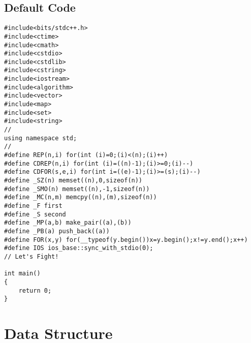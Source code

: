 \documentclass[10pt,twocolumn,oneside]{article}
\begin{document}
\subsection{Default Code}
\begin{lstlisting}
#include<bits/stdc++.h>
#include<ctime>
#include<cmath>
#include<cstdio>
#include<cstdlib>
#include<cstring>
#include<iostream>
#include<algorithm>
#include<vector>
#include<map>
#include<set>
#include<string>
//
using namespace std;
//
#define REP(n,i) for(int (i)=0;(i)<(n);(i)++)
#define CDREP(n,i) for(int (i)=((n)-1);(i)>=0;(i)--)
#define CDFOR(s,e,i) for(int i=((e)-1);(i)>=(s);(i)--)
#define _SZ(n) memset((n),0,sizeof(n))
#define _SMO(n) memset((n),-1,sizeof(n))
#define _MC(n,m) memcpy((n),(m),sizeof(n))
#define _F first
#define _S second
#define _MP(a,b) make_pair((a),(b))
#define _PB(a) push_back((a))
#define FOR(x,y) for(__typeof(y.begin())x=y.begin();x!=y.end();x++)
#define IOS ios_base::sync_with_stdio(0);
// Let's Fight!

int main()
{
	return 0;
}

\end{lstlisting}
\newpage
\section{Data Structure}
\end{document}
